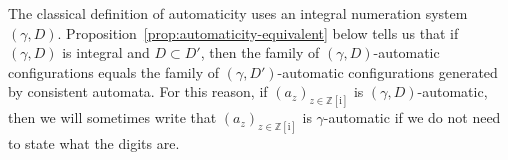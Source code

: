 \documentclass{amsart}
\newcommand{\Z}{\mathbb{Z}}
\newcommand{\ii}{\mathrm{i}}
\newtheorem{theorem}{Theorem}
\newtheorem*{main theorem}{Theorem \ref{thm:main-gaussian}}
\newtheorem{lemma}[theorem]{Lemma}
\newtheorem{definition}[theorem]{Definition}
\theoremstyle{definition}
\begin{document}
The classical definition of automaticity  uses an integral numeration system $(\gamma, D)$.  Proposition~\ref{prop:automaticity-equivalent} below tells us that if 
$(\gamma, D)$ is integral and $D\subset D'$,
then the family of $(\gamma, D)$-automatic configurations   equals  the family of $(\gamma, D')$-automatic configurations generated by consistent automata. For this reason, if $(a_z)_{z\in \Z[\ii]}$ is $(\gamma ,D)$-automatic, then we will sometimes write that $(a_z)_{z\in \Z[\ii]}$ is $\gamma$-automatic if we do not need to state what the digits are.








\end{document}
